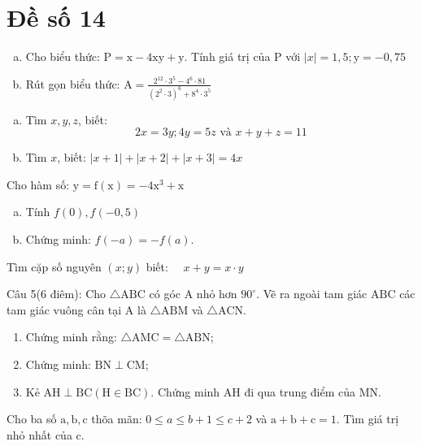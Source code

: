 \onehalfspacing
\section{Đề số 14}

\begin{bt} 
    \hfill
	\begin{enumerate}[a.]
		\item Cho biểu thức: $\mathrm{P}=\mathrm{x}-4 \mathrm{xy}+\mathrm{y}$. Tính giá trị của $\mathrm{P}$ với $|x|=1,5 ; \mathrm{y}=-0,75$
        \item Rút gọn biểu thức: $\mathrm{A}=\frac{2^{12} \cdot 3^5-4^6 \cdot 81}{\left(2^2 \cdot 3\right)^6+8^4 \cdot 3^5}$
	\end{enumerate}
	\loigiai{} 
\end{bt}

\begin{bt}
	\hfill
	\begin{enumerate}[a.]
		\item Tìm $x, y, z$, biết:
        $$
        2 x=3 y ; 4 y=5 z \text { và } x+y+z=11
        $$
        \item Tìm $x$, biết: $|x+1|+|x+2|+|x+3|=4 x$
	\end{enumerate}
	\loigiai{} 
\end{bt}

\begin{bt}
	Cho hàm số: $\mathrm{y}=\mathrm{f}(\mathrm{x})=-4 \mathrm{x}^3+\mathrm{x}$
	\begin{enumerate}[a.]
		\item Tính $f(0), f(-0,5)$
        \item Chứng minh: $f(-a)=-f(a)$.
	\end{enumerate}
	\loigiai{}
\end{bt}

\begin{bt}
    Tìm cặp số nguyên $(x ; y)$ biết: $\quad x+y=x \cdot y$
\loigiai{}
\end{bt}

\begin{bt}
    Câu 5(6 điêm): Cho $\triangle \mathrm{ABC}$ có góc $\mathrm{A}$ nhỏ hơn $90^{\circ}$. Vẽ ra ngoài tam giác $\mathrm{ABC}$ các tam giác vuông cân tại $\mathrm{A}$ là $\triangle \mathrm{ABM}$ và $\triangle \mathrm{ACN}$.
    \begin{enumerate} 
        \item Chứng minh rằng: $\triangle \mathrm{AMC}=\triangle \mathrm{ABN}$;
        \item Chứng minh: $\mathrm{BN} \perp \mathrm{CM}$;
        \item Kẻ $\mathrm{AH} \perp \mathrm{BC}(\mathrm{H} \in \mathrm{BC})$. Chứng minh $\mathrm{AH}$ đi qua trung điểm của $\mathrm{MN}$.
    \end{enumerate}
\loigiai{}
\end{bt}

\begin{bt}
    Cho ba số $\mathrm{a}, \mathrm{b}, \mathrm{c}$ thõa mãn: $0 \leq a \leq b+1 \leq c+2$ và $\mathrm{a}+\mathrm{b}+\mathrm{c}=1$. Tìm giá trị nhỏ nhất của c.
\loigiai{}
\end{bt}